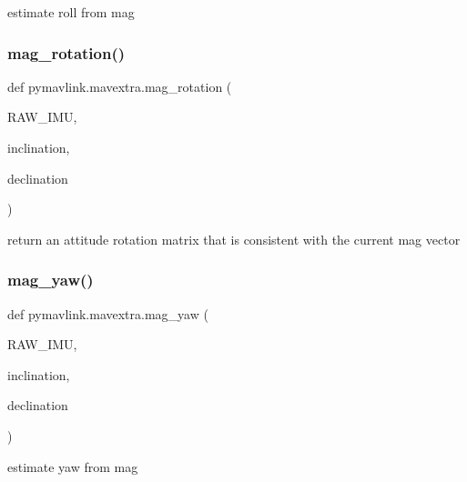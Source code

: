\begin{DoxyVerb}estimate roll from mag\end{DoxyVerb}
 \mbox{\label{namespacepymavlink_1_1mavextra_a55bf2db7a98272c74d86e6e721afddb1}} 
\subsubsection{\texorpdfstring{mag\+\_\+rotation()}{mag\_rotation()}}
{\footnotesize\ttfamily def pymavlink.\+mavextra.\+mag\+\_\+rotation (\begin{DoxyParamCaption}\item[{}]{R\+A\+W\+\_\+\+I\+MU,  }\item[{}]{inclination,  }\item[{}]{declination }\end{DoxyParamCaption})}

\begin{DoxyVerb}return an attitude rotation matrix that is consistent with the current mag
   vector\end{DoxyVerb}
 \mbox{\label{namespacepymavlink_1_1mavextra_aa2959db40d0a944e4b7f46e3128df872}} 
\subsubsection{\texorpdfstring{mag\+\_\+yaw()}{mag\_yaw()}}
{\footnotesize\ttfamily def pymavlink.\+mavextra.\+mag\+\_\+yaw (\begin{DoxyParamCaption}\item[{}]{R\+A\+W\+\_\+\+I\+MU,  }\item[{}]{inclination,  }\item[{}]{declination }\end{DoxyParamCaption})}

\begin{DoxyVerb}estimate yaw from mag\end{DoxyVerb}
 \mbox{\label{namespacepymavlink_1_1mavextra_ae2ac3b544989ec220c6ef351e7ef5204}} 
